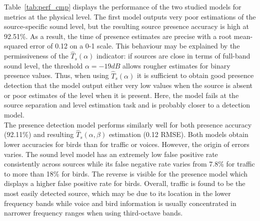 \documentclass[11pt,a4paper]{article}
\begin{document}
Table~\ref{tab:perf_cmp} displays the performance of the two studied models for metrics at the physical level. The first model outputs very poor estimations of the source-specific sound level, but the resulting source presence accuracy is high at 92.51\%. As a result, the time of presence estimates are precise with a root mean-squared error of 0.12 on a 0-1 scale. This behaviour may be explained by the permissiveness of the $\hat T_s(\alpha)$ indicator: if sources are close in terms of full-band sound level, the threshold $\alpha = -19dB$ allows rougher estimates for binary presence values. Thus, when using $\hat T_s(\alpha)$ it is sufficient to obtain good presence detection that the model output either very low values when the source is absent or poor estimates of the level when it is present. Here, the model fails at the source separation and level estimation task and is probably closer to a detection model.\\

The presence detection model performs similarly well for both presence accuracy (92.11\%) and resulting $\hat T_s(\alpha, \beta)$ estimation (0.12 RMSE). Both models obtain lower accuracies for birds than for traffic or voices. However, the origin of errors varies. The sound level model has an extremely low false positive rate consistently across sources while its false negative rate varies from 7.8\% for traffic to more than 18\% for birds. The reverse is visible for the presence model which displays a higher false positive rate for birds. Overall, traffic is found to be the most easily detected source, which may be due to its location in the lower frequency bands while voice and bird information is usually concentrated in narrower frequency ranges when using third-octave bands.\\
\end{document}
